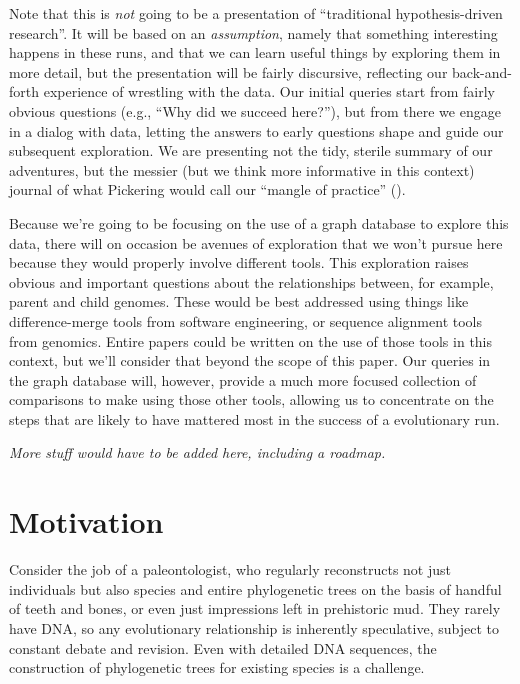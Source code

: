 Note that this is \emph{not} going to be a presentation of ``traditional hypothesis-driven 
research''. It will be based on an \emph{assumption}, namely that something interesting happens in
these runs, and that we can learn useful things by exploring them in more detail, but the presentation
will be fairly discursive, reflecting our back-and-forth experience of wrestling with the data. Our
initial queries start from fairly obvious questions (e.g., ``Why did we succeed here?''), but from
there we engage in a dialog with data, letting the answers to early questions shape and guide our 
subsequent exploration. We are presenting not the tidy, sterile summary of our adventures, but
the messier (but we think more informative in this context) journal of what Pickering would call
our ``mangle of practice'' (\cite{smith2008mangle, pickering:AJS:1993}).

Because we're going to be focusing on the use of a graph database to explore this data, there will
on occasion be avenues of exploration that we won't pursue here because they would properly involve
different tools. This exploration raises obvious and important questions about the relationships between,
for example, parent and child genomes. These would be best addressed using things like 
difference-merge tools from software engineering, or sequence alignment tools from genomics.
Entire papers could be written on the use of those tools in this context, but we'll consider that
beyond the scope of this paper. Our queries in the graph database will, however, provide a much more 
focused collection of comparisons to make using those other tools, allowing us to concentrate on the
steps that are likely to have mattered most in the success of a evolutionary run.

\emph{More stuff would have to be added here, including a roadmap.}

\section{Motivation}
\label{sec:motivation}

Consider the job of a paleontologist, who regularly reconstructs not just individuals but also
species and entire phylogenetic trees on the basis of handful of teeth and bones, or even just
impressions left in prehistoric mud. They rarely have DNA, so any evolutionary relationship is
inherently speculative, subject to constant debate and revision. Even with detailed DNA sequences,
the construction of phylogenetic trees for existing species is a challenge.

